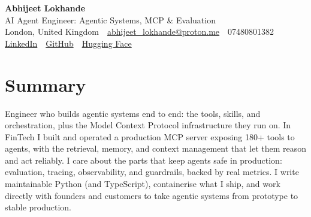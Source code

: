 \documentclass[10pt,a4paper]{article}
\newcommand{\sep}{\,\textcolor{accent!60}{\textbar}\,}
\begin{document}
\begin{center}
  {\fontsize{24}{26}\selectfont\bfseries Abhijeet Lokhande}\\[3pt]
  {\color{accent}\large AI Agent Engineer: Agentic Systems, MCP \& Evaluation}\\[5pt]
  {\small
    London, United Kingdom \sep
    \href{mailto:abhijeet_lokhande@proton.me}{abhijeet\_lokhande@proton.me} \sep
    07480801382 \\[2pt]
    \href{https://www.linkedin.com/in/ablds/}{LinkedIn} \sep
    \href{https://github.com/abhijeetscode}{GitHub} \sep
    \href{https://huggingface.co/ab-ai}{Hugging Face}
  }
\end{center}
\vspace{2pt}

\section{Summary}
Engineer who builds agentic systems end to end: the tools, skills, and orchestration, plus the Model Context Protocol infrastructure they run on. In FinTech I built and operated a production MCP server exposing 180+ tools to agents, with the retrieval, memory, and context management that let them reason and act reliably. I care about the parts that keep agents safe in production: evaluation, tracing, observability, and guardrails, backed by real metrics. I write maintainable Python (and TypeScript), containerise what I ship, and work directly with founders and customers to take agentic systems from prototype to stable production.

\end{document}
